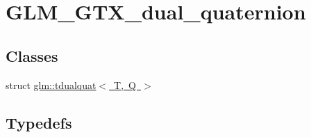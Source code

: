 \hypertarget{group__gtx__dual__quaternion}{}\section{G\+L\+M\+\_\+\+G\+T\+X\+\_\+dual\+\_\+quaternion}
\label{group__gtx__dual__quaternion}
\subsection*{Classes}
\begin{DoxyCompactItemize}
\item 
struct \mbox{\hyperlink{structglm_1_1tdualquat}{glm\+::tdualquat$<$ T, Q $>$}}
\end{DoxyCompactItemize}
\subsection*{Typedefs}
